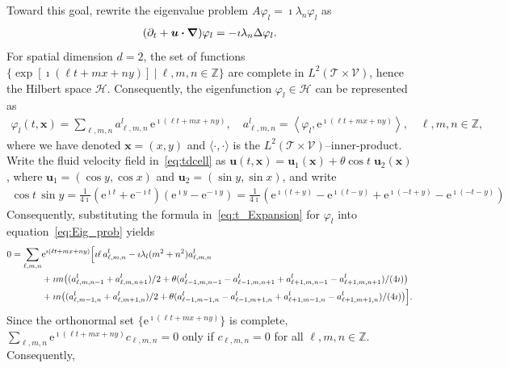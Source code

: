 \documentclass[leqno,onefignum,onetabnum]{siamltex1213}
\newcommand{\e}{\mathrm{e}}
\newcommand{\Tc}{\mathcal{T}}
\newcommand{\Vc}{\mathcal{V}}
\newcommand{\Hs}{\mathscr{H}}
\newcommand\bnabla{\mbox{\boldmath${\nabla}$}}
\providecommand\bcdot{\boldsymbol{\cdot}}
\newcommand{\vecx}{\boldsymbol{x}}
\newcommand{\vecu}{\boldsymbol{u}}
\begin{document}
Toward this goal, rewrite the eigenvalue problem $A\varphi_l=\imath\lambda_n\varphi_l$ as         
%
\begin{align}\label{eq:Eig_prob}
  (\partial_t+\vecu \bcdot\bnabla )\varphi_l=-\imath\lambda_n\Delta\varphi_l.
\end{align}
%
For spatial dimension $d=2$, the set of functions
$\{\exp[\imath(\ell t+mx+ny)] \ |\  \ell,m,n\in\mathbb{Z}\}$ are 
complete in $L^2(\Tc\times\Vc)$, hence the Hilbert space $\Hs$. Consequently,
the eigenfunction $\varphi_l\in\Hs$ can be represented as
%
\begin{align}\label{eq:t_Expansion}
  \varphi_l(t,\vecx)=\sum_{\ell,m,n} a^l_{\ell,m,n}\,\e^{\imath(\ell t+mx+ny)},
  \quad
  a^l_{\ell,m,n}=\left\langle\varphi_l,\e^{\imath(\ell t+mx+ny)}\right\rangle,
  \quad
  \ell,m,n\in\mathbb{Z},
\end{align}
%
where we have denoted $\vecx=(x,y)$ and $\langle\cdot,\cdot\rangle$ is the
$L^2(\Tc\times\Vc)$--inner-product. Write the fluid velocity field
in~\eqref{eq:tdcell} as  
$\vecu(t,\vecx)=\vecu_1(\vecx)+\theta\cos{t}\;\vecu_2(\vecx)$, where
$\vecu_1=(\cos{y},\cos{x})$ and $\vecu_2=(\sin{y},\sin{x})$, and write
%
\begin{align}
  \cos{t}\,\sin{y}=\frac{1}{4\imath}(\e^{\imath t}+\e^{-\imath t})(\e^{\imath y}-\e^{-\imath y})
                =\frac{1}{4\imath}(\e^{\imath (t+y)}-\e^{\imath (t-y)}+\e^{\imath (-t+y)}-\e^{\imath (-t-y)})
\end{align}
%
Consequently, substituting the formula in~\eqref{eq:t_Expansion} for $\varphi_l$
 into equation~\eqref{eq:Eig_prob} yields
%
\begin{align}\label{eq:Fourier_Cell_Problem}
 0=\sum_{\ell,m,n} &\e^{\imath(\ell t+mx+ny)}\Big[
     \imath\ell\,a^l_{\ell,m,n}-\imath\lambda_l(m^2+n^2)a^l_{\ell,m,n}
     \\\notag
     &+\imath m\big((a^l_{\ell,m,n-1}+a^l_{\ell,m,n+1})/2       
        +\theta (a^l_{\ell-1,m,n-1}-a^l_{\ell-1,m,n+1}+a^l_{\ell+1,m,n-1}-a^l_{\ell+1,m,n+1})/(4\imath)
        \big)
        \\\notag
     &+\imath n\big((a^l_{\ell,m-1,n}+a^l_{\ell,m+1,n})/2      
        +\theta(a^l_{\ell-1,m-1,n}-a^l_{\ell-1,m+1,n}+a^l_{\ell+1,m-1,n}-a^l_{\ell+1,m+1,n})/(4\imath)  
         \big)
 \Big].
 \notag
\end{align}
%
Since the orthonormal set $\{\e^{\imath(\ell t+mx+ny)}\}$ is complete,
$\sum_{\ell,m,n} \e^{\imath(\ell t+mx+ny)}c_{\ell,m,n}=0$ only if $c_{\ell,m,n}=0$ for all
$\ell,m,n\in\mathbb{Z}$. Consequently,
\end{document}
